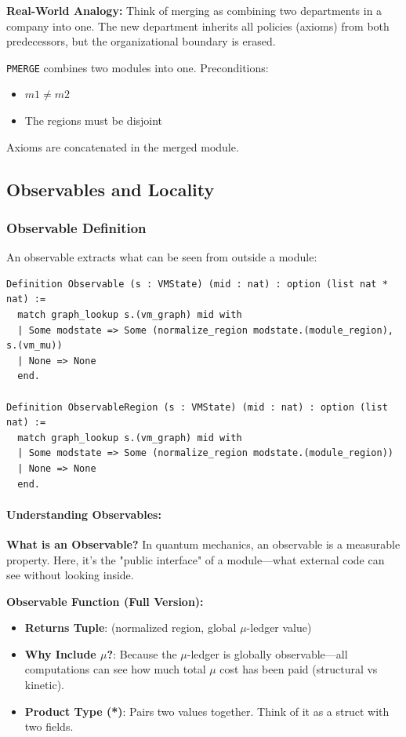 \textbf{Real-World Analogy:} Think of merging as combining two departments in a company into one. The new department inherits all policies (axioms) from both predecessors, but the organizational boundary is erased.

\texttt{PMERGE} combines two modules into one. Preconditions:
\begin{itemize}
    \item $m1 \neq m2$
    \item The regions must be disjoint
\end{itemize}

Axioms are concatenated in the merged module.

\subsection{Observables and Locality}

\subsubsection{Observable Definition}

An observable extracts what can be seen from outside a module:
\begin{lstlisting}
Definition Observable (s : VMState) (mid : nat) : option (list nat * nat) :=
  match graph_lookup s.(vm_graph) mid with
  | Some modstate => Some (normalize_region modstate.(module_region), s.(vm_mu))
  | None => None
  end.

Definition ObservableRegion (s : VMState) (mid : nat) : option (list nat) :=
  match graph_lookup s.(vm_graph) mid with
  | Some modstate => Some (normalize_region modstate.(module_region))
  | None => None
  end.
\end{lstlisting}

\paragraph{Understanding Observables:}
\textbf{What is an Observable?} In quantum mechanics, an observable is a measurable property. Here, it's the "public interface" of a module—what external code can see without looking inside.

\textbf{Observable Function (Full Version):}
\begin{itemize}
    \item \textbf{Returns Tuple}: (normalized region, global $\mu$-ledger value)
    \item \textbf{Why Include $\mu$?}: Because the $\mu$-ledger is globally observable—all computations can see how much total $\mu$ cost has been paid (structural vs kinetic).
    \item \textbf{Product Type (*)}: Pairs two values together. Think of it as a struct with two fields.
\end{itemize}

